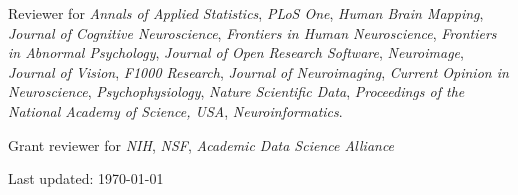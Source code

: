 \documentclass[11pt,fullpage]{article}
\begin{document}
\vspace{4pt}

Reviewer for \emph{Annals of Applied Statistics}, \emph{PLoS One}, \emph{Human Brain Mapping}, \emph{Journal of Cognitive Neuroscience}, \emph{Frontiers in Human Neuroscience}, \emph{Frontiers in Abnormal Psychology}, \emph{Journal of Open Research Software}, \emph{Neuroimage}, \emph{Journal of Vision}, \emph{F1000 Research}, \emph{Journal of Neuroimaging}, \emph{Current Opinion in Neuroscience}, \emph{Psychophysiology}, \emph{Nature Scientific Data}, \emph{Proceedings of the National Academy of Science, USA}, \emph{Neuroinformatics}.

\vspace{4pt}

Grant reviewer for \emph{NIH}, \emph{NSF}, \emph{Academic Data Science Alliance}

\bigskip
\begin{center}
  \begin{footnotesize}
    Last updated: \today
  \end{footnotesize}
\end{center}

\end{document}
